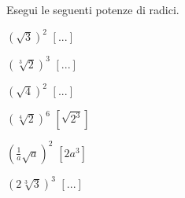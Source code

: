 \begin{esercizio}[\Ast]
 \label{ese:2.46}
Esegui le seguenti potenze di radici.
 \begin{multicols}{3}
 \begin{enumeratea}
 \item $\left(\sqrt 3\right)^2$
  \hfill $\left[...\right]$
 \item $\left(\sqrt[3]2\right)^3$
  \hfill $\left[...\right]$
 \item $\left(\sqrt 4\right)^2$
  \hfill $\left[...\right]$
 \item $\left(\sqrt[4]2\right)^6$
  \hfill $\left[\sqrt{2^3}\right]$
 \item $\left(\frac 1 a\sqrt a\right)^2$
  \hfill $\left[2a^3\right]$
 \item $\left(2\sqrt[3]3\right)^3$
  \hfill $\left[...\right]$

\end{enumeratea}
\end{multicols}
\end{esercizio}
